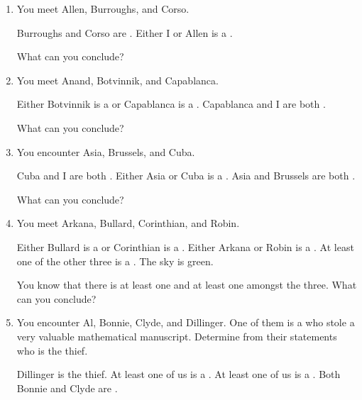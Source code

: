 \probsec{~\ref{sec:conjunctions}}
\begin{enumerate}
    \item You meet Allen, Burroughs, and Corso.
  \begin{dialogue}
     Burroughs and Corso are \knights.
     Either I or Allen is a \knave.
  \end{dialogue}
  What can you conclude?

    \item You meet Anand, Botvinnik, and Capablanca.
  \begin{dialogue}
     Either Botvinnik is a \knave or Capablanca is a \knight.
     Capablanca and I are both \knaves.
  \end{dialogue}
  What can you conclude?

    \item You encounter Asia, Brussels, and Cuba.
  \begin{dialogue}
     Cuba and I are both \knights.
     Either Asia or Cuba is a \knave.
     Asia and Brussels are both \knaves.
  \end{dialogue}
  What can you conclude?

  \item You meet Arkana, Bullard, Corinthian, and Robin.
  \begin{dialogue}
     Either Bullard is a \knight or Corinthian is a \knave.
     Either Arkana or Robin is a \knave.
     At least one of the other three is a \knave.
     The sky is green.
  \end{dialogue}
  You know that there is at least one \knight and at least one \knave amongst the three. What can you conclude?

  \item You encounter Al, Bonnie, Clyde, and Dillinger. One of them is a \knave who stole a very valuable mathematical manuscript. Determine from their statements who is the thief.
  \begin{dialogue}
     Dillinger is the thief.
     At least one of us is a \knight.
     At least one of us is a \knave.
     Both Bonnie and Clyde are \knights.
  \end{dialogue}

\end{enumerate}

